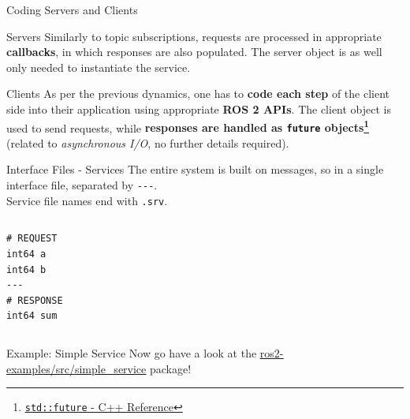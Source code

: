 \begin{frame}{Coding Servers and Clients}
  \begin{block}{Servers}
    Similarly to topic subscriptions, requests are processed in appropriate \textbf{callbacks}, in which responses are also populated. The server object is as well only needed to instantiate the service.
  \end{block}
  \begin{block}{Clients}
    As per the previous dynamics, one has to \textbf{code each step} of the client side into their application using appropriate \textbf{ROS 2 APIs}. The client object is used to send requests, while \textbf{responses are handled as \texttt{future} objects\footnote{\href{https://en.cppreference.com/w/cpp/thread/future}{\color{blue}\underline{\texttt{std::future} - C++ Reference}}}} (related to \emph{asynchronous I/O}, no further details required).
  \end{block}
\end{frame}

\begin{frame}[fragile]{Interface Files - Services}
The entire system is built on messages, so  in a single interface file, separated by \texttt{-{}-{}-}.\\
Service file names end with \texttt{.srv}.
\begin{columns}
\begin{lstlisting}[language=ros2msg, caption=Definition of the \texttt{example\_interfaces/srv/AddTwoInts} service]
# REQUEST
int64 a
int64 b
---
# RESPONSE
int64 sum
\end{lstlisting}
\end{columns}
\end{frame}

\begin{frame}{Example: Simple Service}
Now go have a look at the \href{https://github.com/IntelligentSystemsLabUTV/ros2-examples/tree/galactic/src/simple_service}{\color{blue}\underline{ros2-examples/src/simple\_service}} package!
\end{frame}
